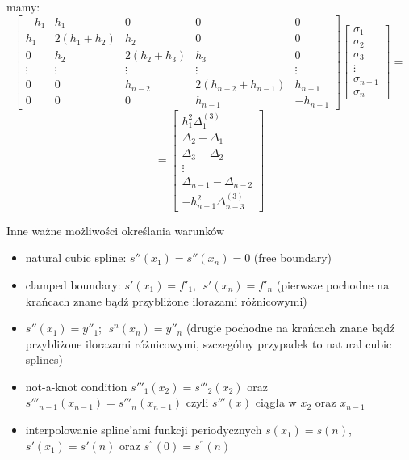     \begin{frame}
    	mamy:
        \[
        \begin{bmatrix}
    -h_{1} & h_{1} & 0 & 0  & 0 \\
    h_{1} & 2(h_{1}+h_{2}) & h_{2} & 0  & 0 \\
    0 & h_{2} & 2(h_{2}+h_{3}) & h_{3} & 0 \\
    \vdots & \vdots & \vdots & \vdots & \vdots \\
    0 & 0 & h_{n-2} & 2(h_{n-2}+h_{n-1}) & h_{n-1} \\
    0 & 0 & 0 & h_{n-1}  & -h_{n-1}
		\end{bmatrix}
        \begin{bmatrix}
        	\sigma_{1} \\
            \sigma_{2} \\
            \sigma_{3} \\
            \vdots \\
            \sigma_{n-1} \\
            \sigma_{n}
        \end{bmatrix}
       	=
        \]
        \[	=
        	\begin{bmatrix}
        		h_{1}^{2}\Delta^{(3)}_{1} \\
                \Delta_{2} - \Delta_{1} \\
                \Delta_{3} - \Delta_{2} \\
                \vdots \\ 
                \Delta_{n-1} - \Delta_{n-2} \\
                -h_{n-1}^{2}\Delta^{(3)}_{n-3}
        	\end{bmatrix}
        \]
    \end{frame}
    \begin{frame}{Inne ważne możliwości określania warunków}
    	\begin{itemize}
    		\item natural cubic spline: $s''(x_{1})=s''(x_{n})=0$ (free boundary)
            \item clamped boundary: $s'(x_{1})=f'_{1}, \ \ s'(x_{n})=f'_{n}$ (pierwsze pochodne na krańcach znane bądź przybliżone ilorazami różnicowymi)
            \item $s''(x_{1})=y''_{1}; \ \ s^{n}(x_{n})=y''_{n}$ (drugie pochodne na krańcach znane bądź przybliżone ilorazami różnicowymi, szczególny przypadek to natural cubic splines)
            \item not-a-knot condition $s'''_1(x_2)=s'''_2(x_2)$ oraz $s'''_{n-1}(x_{n-1})=s'''_{n}(x_{n-1})$  czyli $s'''(x)$ ciągła w $x_{2}$ oraz $x_{n-1}$
            \item interpolowanie spline'ami funkcji periodycznych
            $s(x_1)=s(n)$,
            $s'(x_1)=s'(n)$ oraz
            $s^{''}(0)=s^{''}(n)$
    	\end{itemize}
    \end{frame}
